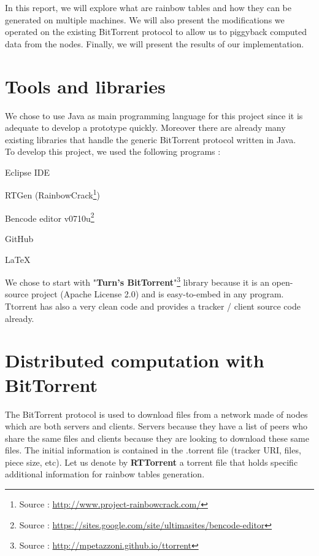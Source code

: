 \documentclass[a4paper]{article}
\begin{document}
{In this report, we will explore what are rainbow tables and how they can be generated on multiple machines. We will also present the modifications we operated on the existing BitTorrent protocol to allow us to piggyback computed data from the nodes. Finally, we will present the results of our implementation.

\section{Tools and libraries}

We chose to use Java as main programming language for this project since it is adequate to develop a prototype quickly. Moreover there are already many existing libraries that handle the generic BitTorrent protocol written in Java.\\

To develop this project, we used the following programs :

\begin{listCustom}
	\item Eclipse IDE
	\item RTGen (RainbowCrack\footnote{Source : \url{http://www.project-rainbowcrack.com/}})
	\item Bencode editor v0710u\footnote{Source : \url{https://sites.google.com/site/ultimasites/bencode-editor}}
	\item GitHub
	\item LaTeX
\end{listCustom}

We chose to start with "\textbf{Turn's BitTorrent}"\footnote{Source : \url{http://mpetazzoni.github.io/ttorrent}} library because it is an open-source project (Apache License 2.0) and is easy-to-embed in any program. Ttorrent has also a very clean code and provides a tracker / client source code already.

\section{Distributed computation with BitTorrent}

The BitTorrent protocol is used to download files from a network made of nodes which are both servers and clients. Servers because they have a list of peers who share the same files and clients because they are looking to download these same files. The initial information is contained in the .torrent file (tracker URI, files, piece size, etc). Let us denote by \textbf{RTTorrent} a torrent file that holds specific additional information for rainbow tables generation.
\vspace{2mm}

}
\end{document}
